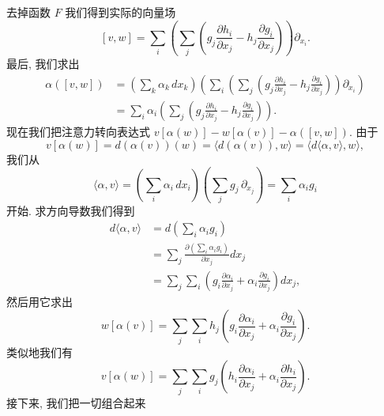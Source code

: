 去掉函数 $F$ 我们得到实际的向量场
\[
[v,w]=\sum_i\left(\sum_j\left(g_j\frac{\partial h_i}{\partial x_j}-h_j\frac{\partial g_i}{\partial x_j}\right)\right)\partial_{x_i}.
\]
最后, 我们求出
\begin{align*}
\alpha([v,w])&=\left(\sum_k\alpha_k\,dx_k\right)
\left(\sum_i\left(\sum_j\left(g_j\frac{\partial h_i}{\partial x_j}-h_j\frac{\partial g_i}{\partial x_j}\right)\right)\partial_{x_i}\right)\\
&=\sum_i\alpha_i\left(\sum_j\left(g_j\frac{\partial h_i}{\partial x_j}-h_j\frac{\partial g_i}{\partial x_j}\right)\right).
\end{align*}
现在我们把注意力转向表达式 $v[\alpha(w)]-w[\alpha(v)]-\alpha([v,w])$. 由于
\[
v[\alpha(w)]=d(\alpha(v))(w)=\bigl\langle d(\alpha(v)),w\bigr\rangle
=\bigl\langle d\langle\alpha,v\rangle,w\bigr\rangle,
\]
我们从
\[
\langle\alpha,v\rangle=\left(\sum_i\alpha_i\,dx_i\right)\left(\sum_j g_j\,\partial_{x_j}\right)=\sum_i\alpha_i g_i
\]
开始. 求方向导数我们得到
\begin{align*}
d\langle\alpha,v\rangle&=d\left(\sum_i\alpha_i g_i\right)\\
&=\sum_j\frac{\partial\left(\sum_i\alpha_i g_i\right)}{\partial x_j}dx_j\\
&=\sum_j\sum_i\left(g_i\frac{\partial\alpha_i}{\partial x_j}+\alpha_i\frac{\partial g_i}{\partial x_j}\right)dx_j,
\end{align*}
然后用它求出
\[
w[\alpha(v)]=\sum_j\sum_i h_j\left(g_i\frac{\partial\alpha_i}{\partial x_j}+\alpha_i\frac{\partial g_i}{\partial x_j}\right).
\]
类似地我们有
\[
v[\alpha(w)]=\sum_j\sum_i g_j\left(h_i\frac{\partial\alpha_i}{\partial x_j}+\alpha_i\frac{\partial h_i}{\partial x_j}\right).
\]
接下来, 我们把一切组合起来
